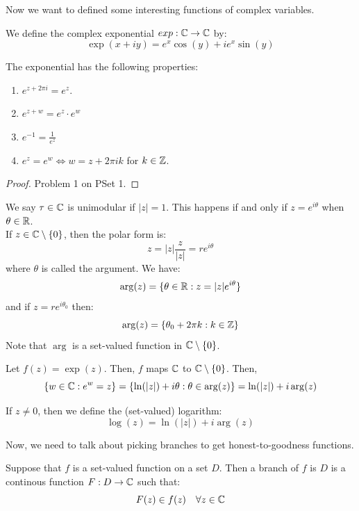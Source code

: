 \documentclass[12pt]{amsart}
\begin{document}
Now we want to defined some interesting functions of complex variables. 
\begin{definition}
    We define the complex exponential $exp: \mathbb C \to \mathbb C$ by: 
        \[ \exp(x+iy) = e^x\cos (y) + ie^x\sin(y)\]
\end{definition}


\begin{proposition}[W 1.16] 
    The exponential has the following properties: 
    \begin{enumerate}
        \item $e^{z+2\pi i} = e^z$. 
        \item $e^{z+w} = e^z \cdot e^w$
        \item $e^{-1} = \frac{1}{e^z}$
        \item $e^z = e^w \iff w = z + 2\pi i k$ for $k \in \mathbb Z$. 
    \end{enumerate}
\end{proposition}
\begin{proof}
    Problem 1 on PSet 1.  
\end{proof}

\begin{definition}
    We say $\tau \in \mathbb C$ is unimodular if $|z| = 1$. This happens if and only if $z = e^{i\theta}$ when $\theta \in \mathbb R$. \\
    If $z \in \mathbb C \setminus \{0\}$, then the polar form is:
    \[ z = |z| \frac{z}{|z|} = re^{i\theta}\]
    where $\theta$ is called the argument. We have:
    \[ \arg(z) = \{\theta \in \mathbb R : z = |z|e^{i\theta}\}\]
    and if $z = re^{i\theta_0}$ then: 
    \[ \arg(z) = \{\theta_0 + 2\pi k : k \in \mathbb Z\}\] 
    Note that $\arg$ is a set-valued function in $\mathbb C \setminus \{0\}$. 
\end{definition}

\begin{proposition}[W 1.2.2]
    Let $f(z) = \exp(z)$. Then, $f$ maps $\mathbb C$ to $\mathbb C \setminus \{0\}$. Then, 
    \[ \{w \in \mathbb C : e^w = z\} = \{\ln(|z|) + i\theta : \theta \in \arg(z)\} = \ln(|z|) + i\arg(z) \]
\end{proposition}

\begin{definition}
    If $z \neq 0$, then we define the (set-valued) logarithm:
    \[ \log(z) = \ln(|z|) + i\arg(z)\]
\end{definition}

Now, we need to talk about picking branches to get honest-to-goodness functions. 
\begin{definition}
    Suppose that $f$ is a set-valued function on a set $D$. Then a branch of $f$ is $D$ is a continous function $F: D \to \mathbb C$ such that: 
    \[ F(z) \in f(z) \quad \forall z \in \mathbb C \]
\end{definition}
\end{document}
